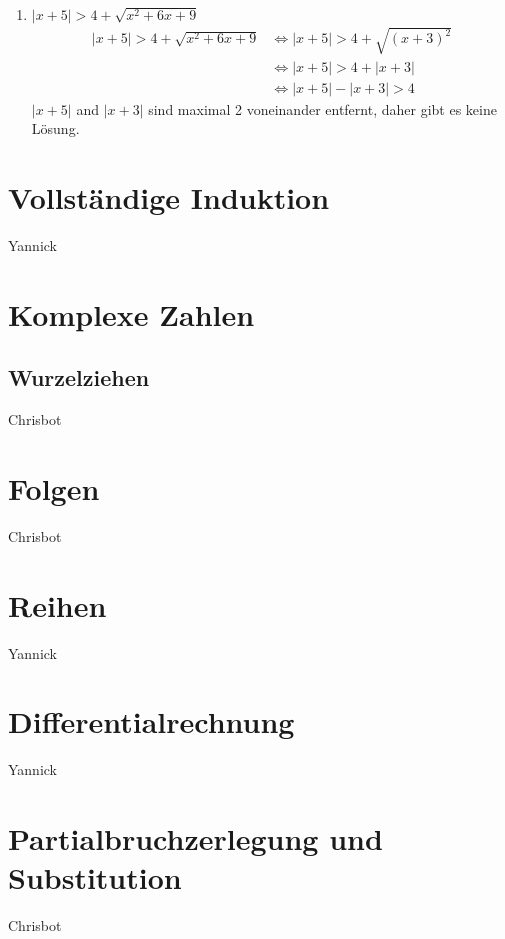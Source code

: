 \documentclass[11pt, a4paper]{article}
\providecommand{\abs}[1]{\left\lvert#1\right\rvert}
\begin{document}
\begin{enumerate}
\begin{align*}
			&\Leftrightarrow 3 < 3x \\
			&\Leftrightarrow 1 < x
			\intertext{Lösung im Fall 2: $\left[ -1, 2 \right) \cap \left( 1, \infty \right) = \left( 1,2 \right)$}
			\intertext{Fall 3: $x \in \left[ 2, \infty \right)$}
			(x-2) < \frac{(x+1)}{2} &\Leftrightarrow 2x-4 < x+1 \\
			&\Leftrightarrow x < 5
			\intertext{Lösung im Fall 3: $\left[ 2, \infty \right) \cap \left( -\infty, 5 \right) = \left[ 2,5 \right)$}
		\end{align*}
		Damit ist die Gesammtlösung: $\emptyset \cup \left( 1,2 \right) \cup \left[ 2,5 \right) = \left( 1, 5 \right)$
	\item $\abs{x+5} > 4 + \sqrt{x^2 + 6x + 9}$
		\begin{align*}
			\abs{x+5} > 4 + \sqrt{x^2 + 6x + 9} &\Leftrightarrow \abs{x+5} > 4 + \sqrt{(x+3)^2} \\
			&\Leftrightarrow \abs{x+5} > 4 + \abs{x+3} \\
			&\Leftrightarrow \abs{x+5} - \abs{x+3} > 4
		\end{align*}
		$\abs{x+5}$ and $\abs{x+3}$ sind maximal 2 voneinander entfernt, daher gibt es keine Lösung.
\end{enumerate}
\section{Vollständige Induktion}
Yannick
\section{Komplexe Zahlen}
\subsection{Wurzelziehen}
Chrisbot
\section{Folgen}
Chrisbot
\section{Reihen}
Yannick
\section{Differentialrechnung}
Yannick
\section{Partialbruchzerlegung und Substitution}
Chrisbot
\end{document}
